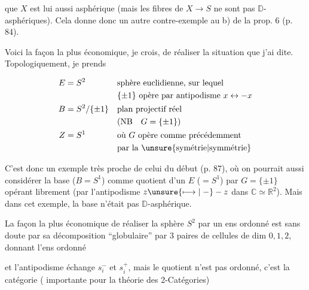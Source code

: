 
que $X$ est lui aussi asphérique (mais les fibres de $X\to S$ ne sont pas $\mathbb D$-asphériques). Cela donne donc un autre contre-exemple au b) de la prop. 6 (p. 84).

Voici la façon la plus économique, je crois, de réaliser la situation que j'ai dite. Topologiquement, je prends 

\[
\begin{aligned}
E&=S^2&&\text{sphère euclidienne, sur lequel}\\
&&&\{\pm1\}\text{ opère par antipodisme }x\leftrightarrow-x\\
B&=S^2/\{\pm1\}&&\text{plan projectif réel}\\
&&&(\mathrm{NB}\quad G=\{\pm1\})\\
Z&=S^1&&\text{où $G$ opère comme précédemment}\\
&&&\text{par la \unsure{symétrie|symmétrie}}
\end{aligned}
\]

C'est donc un exemple très proche de celui du début (p. 87),  où on pourrait aussi considérer la base ($B=S^1$) comme quotient d'un $E$ ($=S^1$) par $G=\{\pm1\}$ opérant librement (par l'antipodisme $z\unsure{\longmapsto|\relbar}-z$ dans $\mathbb C\simeq\mathbb R^2$). Mais dans cet exemple, la base n'était pas $\mathbb D$-asphérique.

La façon la plus économique de réaliser la sphère $S^2$ par un ens ordonné est sans doute par sa décomposition ``globulaire'' par 3 paires de cellules de dim $0,1,2$, donnant l'ens ordonné




et l'antipodisme échange $s_i^-$ et $s_i^+$, mais le  quotient n'est pas ordonné, c'est la catégorie ( importante pour la théorie des 2-Catégories)

